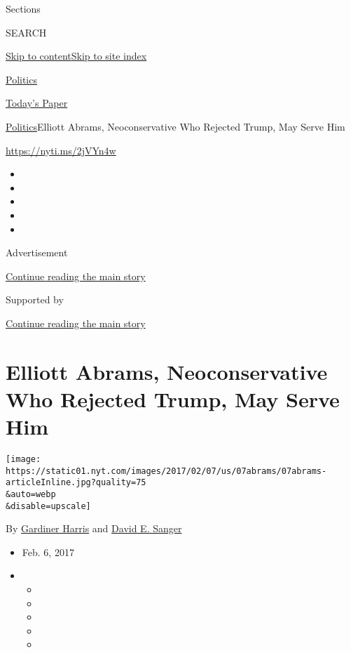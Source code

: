 Sections

SEARCH

\protect\hyperlink{site-content}{Skip to
content}\protect\hyperlink{site-index}{Skip to site index}

\href{https://www.nytimes.com/section/politics}{Politics}

\href{https://myaccount.nytimes.com/auth/login?response_type=cookie\&client_id=vi}{}

\href{https://www.nytimes.com/section/todayspaper}{Today's Paper}

\href{/section/politics}{Politics}\textbar{}Elliott Abrams,
Neoconservative Who Rejected Trump, May Serve Him

\url{https://nyti.ms/2jVYn4w}

\begin{itemize}
\item
\item
\item
\item
\item
\end{itemize}

Advertisement

\protect\hyperlink{after-top}{Continue reading the main story}

Supported by

\protect\hyperlink{after-sponsor}{Continue reading the main story}

\hypertarget{elliott-abrams-neoconservative-who-rejected-trump-may-serve-him}{%
\section{Elliott Abrams, Neoconservative Who Rejected Trump, May Serve
Him}\label{elliott-abrams-neoconservative-who-rejected-trump-may-serve-him}}

\texttt{[image: https://static01.nyt.com/images/2017/02/07/us/07abrams/07abrams-articleInline.jpg?quality=75\\\&auto=webp\\\&disable=upscale]}

By \href{http://www.nytimes.com/by/gardiner-harris}{Gardiner Harris} and
\href{http://www.nytimes.com/by/david-e-sanger}{David E. Sanger}

\begin{itemize}
\item
  Feb. 6, 2017
\item
  \begin{itemize}
  \item
  \item
  \item
  \item
  \item
  \end{itemize}
\end{itemize}

